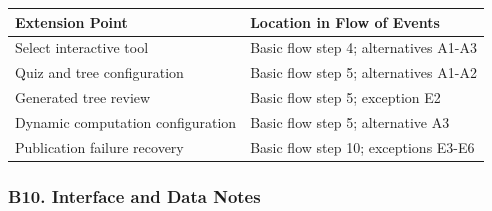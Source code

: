 \documentclass[12pt]{article}
\renewcommand{\baselinestretch}{1.5}
\begin{document}
\begingroup
\small
\renewcommand{\baselinestretch}{1.0}\selectfont
\renewcommand{\arraystretch}{1.15}
\setlength{\tabcolsep}{6pt}
\begin{longtable}{|>{\raggedright\arraybackslash}p{}|>{\raggedright\arraybackslash}p{}|}
\hline
\textbf{Extension Point} & \textbf{Location in Flow of Events} \\ \hline
\endhead
Select interactive tool & Basic flow step 4; alternatives A1-A3 \\ \hline
Quiz and tree configuration & Basic flow step 5; alternatives A1-A2 \\ \hline
Generated tree review & Basic flow step 5; exception E2 \\ \hline
Dynamic computation configuration & Basic flow step 5; alternative A3 \\ \hline
Publication failure recovery & Basic flow step 10; exceptions E3-E6 \\ \hline
\end{longtable}
\endgroup
\par\medskip

\hypertarget{sec:b10-interface-and-data-notes}{}
\subsubsection*{B10. Interface and Data Notes}
\par\medskip
\end{document}

